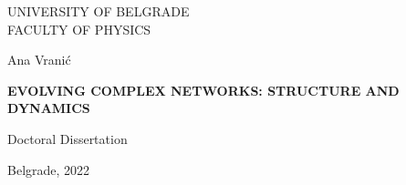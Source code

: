 \thispagestyle{empty}
\centering

\Large{
    UNIVERSITY OF BELGRADE \\
    FACULTY OF PHYSICS
}

\vspace{5.5cm}

\Large{
    Ana Vrani\' c
}

\vspace{.5cm}


\textbf{\LARGE 
  { EVOLVING COMPLEX NETWORKS: STRUCTURE AND DYNAMICS}
  }

\vspace{.5cm}

\Large{
    Doctoral Dissertation }

    \vspace{9.1cm}

\Large{
    Belgrade, 2022
}

\pagebreak
\justify

